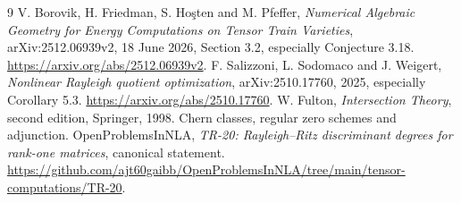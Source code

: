\documentclass[11pt]{article}
\begin{document}
\begin{thebibliography}{9}
V. Borovik, H. Friedman, S. Ho\c{s}ten and M. Pfeffer,
\emph{Numerical Algebraic Geometry for Energy Computations on Tensor
Train Varieties}, arXiv:2512.06939v2, 18 June 2026, Section 3.2,
especially Conjecture 3.18.
\url{https://arxiv.org/abs/2512.06939v2}.
F. Salizzoni, L. Sodomaco and J. Weigert,
\emph{Nonlinear Rayleigh quotient optimization},
arXiv:2510.17760, 2025, especially Corollary 5.3.
\url{https://arxiv.org/abs/2510.17760}.
W. Fulton, \emph{Intersection Theory}, second edition,
Springer, 1998. Chern classes, regular zero schemes and adjunction.
OpenProblemsInNLA, \emph{TR-20: Rayleigh--Ritz discriminant degrees for
rank-one matrices}, canonical statement.
\url{https://github.com/ajt60gaibb/OpenProblemsInNLA/tree/main/tensor-computations/TR-20}.
\end{thebibliography}
\end{document}
